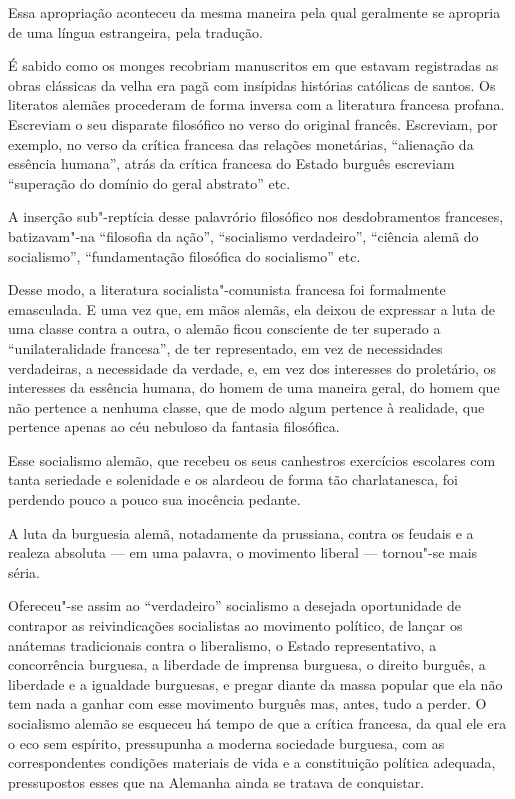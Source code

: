 Essa apropriação aconteceu da mesma maneira pela qual geralmente se
apropria de uma língua estrangeira, pela tradução.

É sabido como os monges recobriam manuscritos em que estavam registradas
as obras clássicas da velha era pagã com insípidas histórias católicas
de santos. Os literatos alemães procederam de forma inversa com a
literatura francesa profana. Escreviam o seu disparate filosófico no
verso do original francês. Escreviam, por exemplo, no verso da crítica
francesa das relações monetárias, “alienação da essência humana”, atrás
da crítica francesa do Estado burguês escreviam “superação do domínio
do geral abstrato” etc.

A inserção sub"-reptícia desse palavrório filosófico nos desdobramentos
franceses, batizavam"-na “filosofia da ação”, “socialismo verdadeiro”,
“ciência alemã do socialismo”, “fundamentação filosófica do socialismo”
etc.

Desse modo, a literatura socialista"-comunista francesa foi formalmente
emasculada. E uma vez que, em mãos alemãs, ela deixou de expressar a
luta de uma classe contra a outra, o alemão ficou consciente de ter
superado a “unilateralidade francesa”, de ter representado, em vez de
necessidades verdadeiras, a necessidade da verdade, e, em vez dos
interesses do proletário, os interesses da essência humana, do homem de
uma maneira geral, do homem que não pertence a nenhuma classe, que de
modo algum pertence à realidade, que pertence apenas ao céu nebuloso da
fantasia filosófica.

Esse socialismo alemão, que recebeu os seus canhestros exercícios
escolares com tanta seriedade e solenidade e os alardeou de forma tão
charlatanesca, foi perdendo pouco a pouco sua inocência pedante.

A luta da burguesia alemã, notadamente da prussiana, contra os feudais e
a realeza absoluta  ---  em uma palavra, o movimento liberal  ---  tornou"-se
mais séria.

Ofereceu"-se assim ao “verdadeiro” socialismo a desejada oportunidade
de contrapor as reivindicações socialistas ao movimento político, de
lançar os anátemas tradicionais contra o liberalismo, o Estado
representativo, a concorrência burguesa, a liberdade de imprensa
burguesa, o direito burguês, a liberdade e a igualdade burguesas, e pregar
diante da massa popular que ela não tem nada a ganhar com esse
movimento burguês mas, antes, tudo a perder. O socialismo alemão se
esqueceu há tempo de que a crítica francesa, da qual ele era o eco sem
espírito, pressupunha a moderna sociedade burguesa, com as
correspondentes condições materiais de vida e a constituição política
adequada, pressupostos esses que na Alemanha ainda se tratava de
conquistar.

